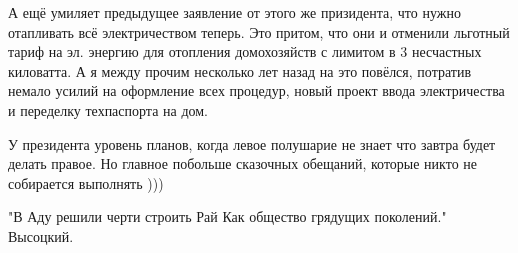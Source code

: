 \begin{itemize}
А ещё умиляет предыдущее заявление от этого же призидента, что нужно отапливать
всё электричеством теперь. Это притом, что они и отменили льготный тариф на эл.
энергию для отопления домохозяйств с лимитом в 3 несчастных киловатта. А я
между прочим несколько лет назад на это повёлся, потратив немало усилий на
оформление всех процедур, новый проект ввода электричества и переделку
техпаспорта на дом.

У президента уровень планов, когда левое полушарие не знает что завтра будет
делать правое. Но главное побольше сказочных обещаний, которые никто не
собирается выполнять )))


"В Аду решили черти строить Рай
Как общество грядущих поколений." Высоцкий.



\end{itemize} %
